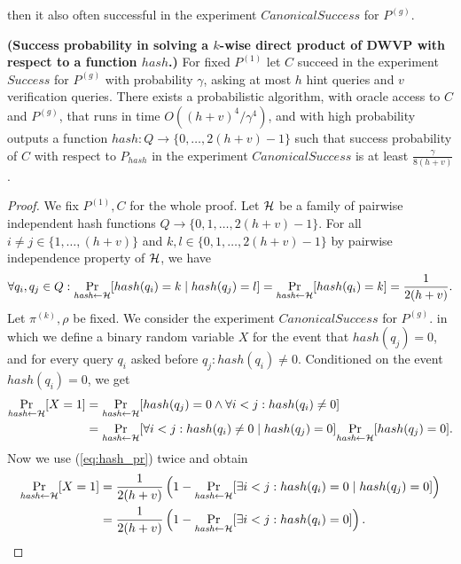 then it also often successful in the experiment $CanonicalSuccess$ for $P^{(g)}$.
%
\begin{lemma}\textbf{(Success probability in solving a $k$-wise direct product of DWVP with respect to a function $hash$.)}
\label{lemma:hash_function_probability}
For fixed $P^{(1)}$ let $C$ succeed in the experiment $Success$ for $P^{(g)}$ with probability $\gamma$,
asking at most $h$ hint queries and $v$ verification queries.
There exists a probabilistic algorithm, with oracle access to $C$ and $P^{(g)}$, that runs in time $O((h+v)^4/\gamma^4)$,
and with high probability outputs a function $hash: Q \rightarrow \{0, \dots, 2(h+v)-1\}$
such that success probability of $C$ with respect to $P_{hash}$ in the experiment $CanonicalSuccess$ is at least $\frac{\gamma}{8(h+v)}$.
\end{lemma}
%
\begin{proof}
We fix $P^{(1)}, C$ for the whole proof.
Let $\mathcal{H}$ be a family of pairwise independent hash functions $Q \rightarrow \{0,1, \dots,2(h+v)-1\}$.
For all $i \neq j \in \{1, \dots, (h+v)\}$ and $k,l \in \{0,1,\dots,2(h+v)-1\}$ by pairwise independence property of $\mathcal{H}$,
we have
\begin{align}
  \label{eq:hash_pr}
 \forall q_i,q_j \in Q : \underset{\textit{hash} \leftarrow \mathcal{H}}{\Pr}[hash(q_i) = k \mid hash(q_j) = l] = \underset{\textit{hash} \leftarrow \mathcal{H}}{\Pr}[hash(q_i) = k] = \frac{1}{2(h+v)}.
\end{align}
Let $\pi^{(k)}, \rho$ be fixed. We consider the experiment $CanonicalSuccess$ for $P^{(g)}$.
in which we define a binary random variable $X$ for the event that $hash(q_j) = 0$, and for every query $q_i$ asked before $q_j : hash(q_i) \neq 0$.
Conditioned on the event $hash(q_i) = 0$, we get
\begin{align*}
  \underset{\textit{hash} \leftarrow \mathcal{H}}{\Pr}[X=1] &= \underset{\textit{hash} \leftarrow \mathcal{H}}{\Pr}[hash(q_j) = 0 \land \forall i < j : hash(q_i) \neq 0] \\
  &=\underset{\textit{hash} \leftarrow \mathcal{H}}{\Pr}[\forall i < j : hash(q_i) \neq 0 \mid hash(q_j) = 0] \underset{\textit{hash} \leftarrow \mathcal{H}}{\Pr}[hash(q_j) = 0].
\end{align*}
Now we use (\ref{eq:hash_pr}) twice and obtain
\begin{align*}
\underset{\textit{hash} \leftarrow \cH}{\Pr}[X=1] &=
\frac{1}{2(h+v)}\left(1 -\underset{\textit{hash} \leftarrow \cH}{\Pr}[\exists i < j : hash(q_i) = 0 \mid hash(q_j) = 0] \right) \\
 &= \frac{1}{2(h+v)} \left( 1 -\underset{\textit{hash} \leftarrow \cH}{\Pr}[\exists i < j : hash(q_i) = 0] \right).

\end{align*}
\end{proof}
